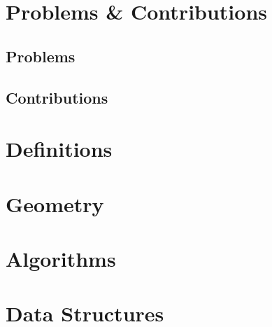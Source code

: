\documentclass{book}
\date{\today}
\begin{document}
\maketitle

\frontmatter




\mainmatter



\part{Problems \& Contributions}
\chapter{Problems}



\chapter{Contributions}


\part{Definitions}



\part{Geometry}\label{sec:preliminaries}


\part{Algorithms}



\part{Data Structures}



\appendix



\backmatter

\end{document}
